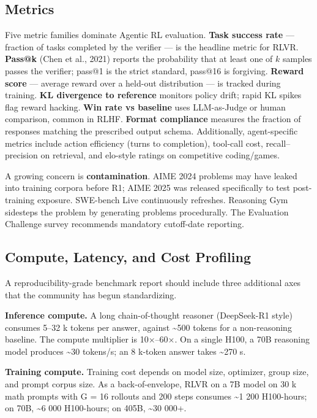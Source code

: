 \documentclass{article}
\begin{document}
\subsection{Metrics}\label{metrics}

Five metric families dominate Agentic RL evaluation. \textbf{Task success rate} --- fraction of tasks completed by the verifier --- is the headline metric for RLVR. \textbf{Pass@k} (Chen et al., 2021) reports the probability that at least one of \(k\) samples passes the verifier; pass@1 is the strict standard, pass@16 is forgiving. \textbf{Reward score} --- average reward over a held-out distribution --- is tracked during training. \textbf{KL divergence to reference} monitors policy drift; rapid KL spikes flag reward hacking. \textbf{Win rate vs baseline} uses LLM-as-Judge or human comparison, common in RLHF. \textbf{Format compliance} measures the fraction of responses matching the prescribed output schema. Additionally, agent-specific metrics include action efficiency (turns to completion), tool-call cost, recall--precision on retrieval, and elo-style ratings on competitive coding/games.

A growing concern is \textbf{contamination}. AIME 2024 problems may have leaked into training corpora before R1; AIME 2025 was released specifically to test post-training exposure. SWE-bench Live continuously refreshes. Reasoning Gym sidesteps the problem by generating problems procedurally. The Evaluation Challenge survey \citep{dong20262026} recommends mandatory cutoff-date reporting.

\subsection{Compute, Latency, and Cost Profiling}\label{compute-latency-and-cost-profiling}

A reproducibility-grade benchmark report should include three additional axes that the community has begun standardizing.

\textbf{Inference compute.} A long chain-of-thought reasoner (DeepSeek-R1 style) consumes 5--32 k tokens per answer, against \textasciitilde500 tokens for a non-reasoning baseline. The compute multiplier is 10×--60×. On a single H100, a 70B reasoning model produces \textasciitilde30 tokens/s; an 8 k-token answer takes \textasciitilde270 s.

\textbf{Training compute.} Training cost depends on model size, optimizer, group size, and prompt corpus size. As a back-of-envelope, RLVR on a 7B model on 30 k math prompts with G = 16 rollouts and 200 steps consumes \textasciitilde1 200 H100-hours; on 70B, \textasciitilde6 000 H100-hours; on 405B, \textasciitilde30 000+.
\end{document}
